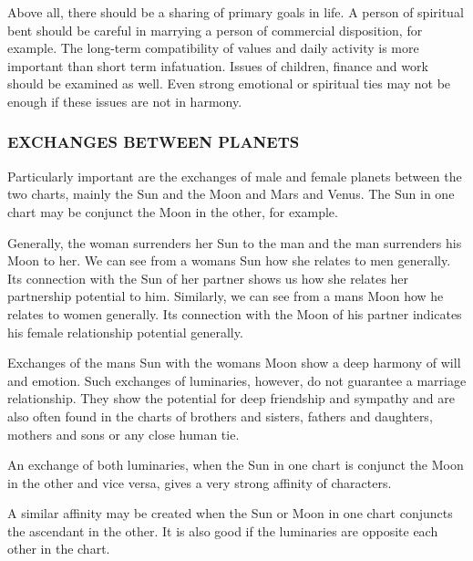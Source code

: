  

Above all, there should be a sharing of primary goals in life. A person of spiritual bent should be careful in marrying a person of commercial disposition, for example. The long-term compatibility of values and daily activity is more important than short term infatuation. Issues of children, finance and work should be examined as well. Even strong emotional or spiritual ties may not be enough if these issues are not in harmony.

 



 

\subsubsection{EXCHANGES BETWEEN PLANETS}
 

Particularly important are the exchanges of male and female planets between the two charts, mainly the Sun and the Moon and Mars and Venus. The Sun in one chart may be conjunct the Moon in the other, for example.

 


 

Generally, the woman surrenders her Sun to the man and the man surrenders his Moon to her. We can see from a womans Sun how she relates to men generally. Its connection with the Sun of her partner shows us how she relates her partnership potential to him. Similarly, we can see from a mans Moon how he relates to women generally. Its connection with the Moon of his partner indicates his female relationship potential generally.

 

Exchanges of the mans Sun with the womans Moon show a deep harmony of will and emotion. Such exchanges of luminaries, however, do not guarantee a marriage relationship. They show the potential for deep friendship and sympathy and are also often found in the charts of brothers and sisters, fathers and daughters, mothers and sons or any close human tie.

 

An exchange of both luminaries, when the Sun in one chart is conjunct the Moon in the other and vice versa, gives a very strong affinity of characters.

 

A similar affinity may be created when the Sun or Moon in one chart conjuncts the ascendant in the other. It is also good if the luminaries are opposite each other in the chart.


